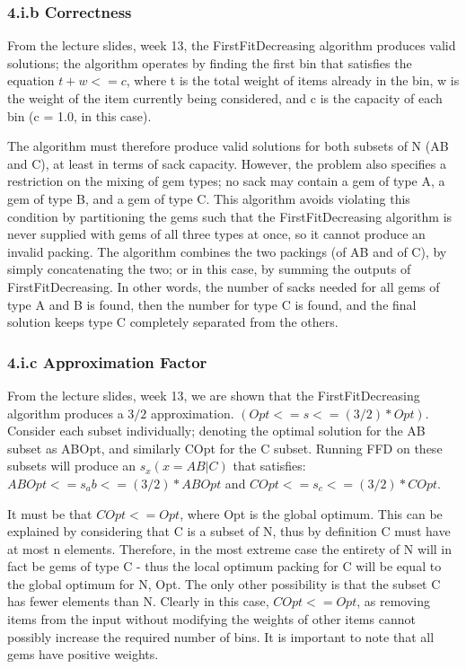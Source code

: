 \documentclass[paper=a4, fontsize=12pt]{article}
\begin{document}
\subsubsection{4.i.b Correctness}
From the lecture slides, week 13, the FirstFitDecreasing algorithm produces
valid solutions; the algorithm operates by finding the first bin that satisfies
the equation \(t + w <= c\), where t is the total weight of items already in
the bin, w is the weight of the item currently being considered, and c is the
capacity of each bin (c = 1.0, in this case).

The algorithm must therefore produce valid solutions for both subsets of N (AB
and C), at least in terms of sack capacity. However, the problem also specifies
a restriction on the mixing of gem types; no sack may contain a gem of type A,
a gem of type B, and a gem of type C. This algorithm avoids violating this
condition by partitioning the gems such that the FirstFitDecreasing algorithm
is never supplied with gems of all three types at once, so it cannot produce an
invalid packing. The algorithm combines the two packings (of AB and of C), by
simply concatenating the two; or in this case, by summing the outputs of
FirstFitDecreasing. In other words, the number of sacks needed for all gems of
type A and B is found, then the number for type C is found, and the final
solution keeps type C completely separated from the others.

\subsubsection{4.i.c Approximation Factor}
From the lecture slides, week 13, we are shown that the FirstFitDecreasing
algorithm produces a \(3/2\) approximation. \((Opt <= s <= (3/2) *
Opt)\). Consider each subset individually; denoting the optimal solution for
the AB subset as ABOpt, and similarly COpt for the C subset. Running FFD on
these subsets will produce an \(s_x (x = AB | C)\) that satisfies: \(ABOpt <=
s_ab <= (3/2) * ABOpt\) and \(COpt <= s_c <= (3/2) * COpt\).

It must be that \(COpt <= Opt\), where Opt is the global optimum. This can be
explained by considering that C is a subset of N, thus by definition C must
have at most n elements. Therefore, in the most extreme case the entirety of N
will in fact be gems of type C - thus the local optimum packing for C will be
equal to the global optimum for N, Opt. The only other possibility is that the
subset C has fewer elements than N. Clearly in this case, \(COpt <= Opt\), as
removing items from the input without modifying the weights of other items
cannot possibly increase the required number of bins. It is important to note
that all gems have positive weights.
\end{document}
